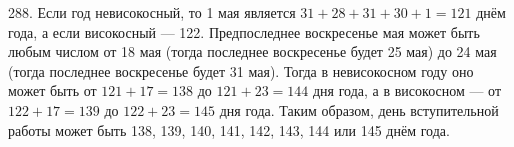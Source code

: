 288. Если год невисокосный, то 1 мая является $31+28+31+30+1=121$ днём года, а если високосный --- 122. Предпоследнее воскресенье мая может быть любым числом от 18 мая (тогда последнее воскресенье будет 25 мая) до 24 мая (тогда последнее воскресенье будет 31 мая). Тогда в невисокосном году оно может быть от $121+17=138$ до $121+23=144$ дня года, а в високосном --- от $122+17=139$ до $122+23=145$ дня года. Таким образом, день вступительной работы может быть 138, 139, 140, 141, 142, 143, 144 или 145 днём года.\\
